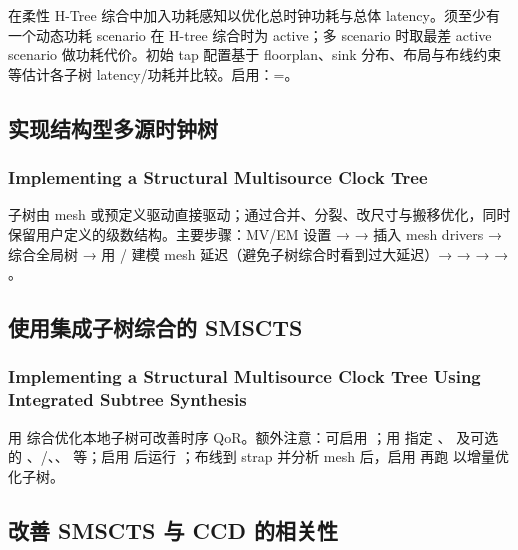 在柔性 H-Tree 综合中加入功耗感知以优化总时钟功耗与总体 latency。须至少有一个动态功耗 scenario 在 H-tree 综合时为 active；多 scenario 时取最差 active scenario 做功耗代价。初始 tap 配置基于 floorplan、sink 分布、布局与布线约束等估计各子树 latency/功耗并比较。启用：=。

\subsection{实现结构型多源时钟树}
\subsubsection*{Implementing a Structural Multisource Clock Tree}

子树由 mesh 或预定义驱动直接驱动；通过合并、分裂、改尺寸与搬移优化，同时保留用户定义的级数结构。主要步骤：MV/EM 设置 →  → 插入 mesh drivers → 综合全局树 → 用 / 建模 mesh 延迟（避免子树综合时看到过大延迟）→  →  →  → 。

\subsection{使用集成子树综合的 SMSCTS}
\subsubsection*{Implementing a Structural Multisource Clock Tree Using Integrated Subtree Synthesis}

用  综合优化本地子树可改善时序 QoR。额外注意：可启用 ；用  指定 、 及可选的 、/、、 等；启用  后运行 ；布线到 strap 并分析 mesh 后，启用  再跑  以增量优化子树。

\subsection{改善 SMSCTS 与 CCD 的相关性}
